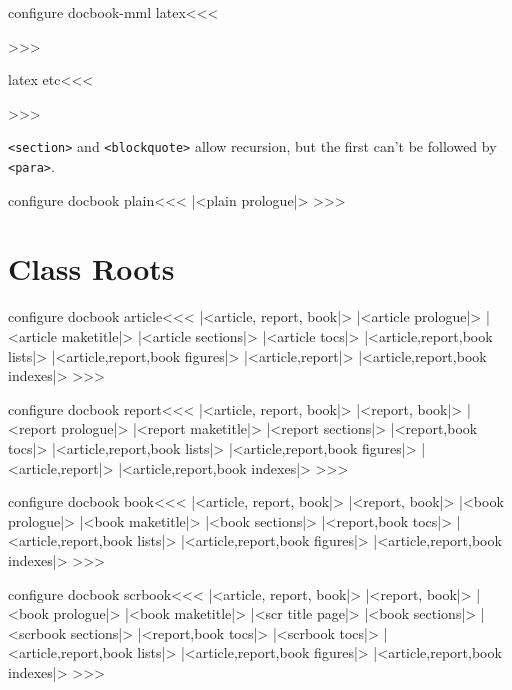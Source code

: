 \<configure docbook-mml latex\><<<
   {\IgnorePar\EndP{}}
   {}
   {\IgnorePar{}\ShowPar\par}
>>>







\<latex etc\><<<
   {\IgnorePar\EndP{}}
   {\ShowPar\par}
   {\IgnorePar\EndP{}\ShowPar\par}
>>>

\verb+<section>+ and \verb+<blockquote>+ allow recursion,
but the first can't be followed by \verb+<para>+.


\<configure docbook plain\><<< 
|<plain prologue|>
>>>

\section{Class Roots}

\<configure docbook article\><<< 
|<article, report, book|>
|<article prologue|>
|<article maketitle|>
|<article sections|>
|<article tocs|>
|<article,report,book lists|>
|<article,report,book figures|>
|<article,report|>
|<article,report,book indexes|>
>>>



\<configure docbook report\><<< 
|<article, report, book|>
|<report, book|>
|<report prologue|>
|<report maketitle|>
|<report sections|>
|<report,book tocs|>
|<article,report,book lists|>
|<article,report,book figures|>
|<article,report|>
|<article,report,book indexes|>
>>>



\<configure docbook book\><<< 
|<article, report, book|>
|<report, book|>
|<book prologue|>
|<book maketitle|>
|<book sections|>
|<report,book tocs|>
|<article,report,book lists|>
|<article,report,book figures|>
|<article,report,book indexes|>
>>>




\<configure docbook scrbook\><<< 
|<article, report, book|>
|<report, book|>
|<book prologue|>
|<book maketitle|>
|<scr title page|>
|<book sections|>
|<scrbook sections|>
|<report,book tocs|>
|<scrbook tocs|>
|<article,report,book lists|>
|<article,report,book figures|>
|<article,report,book indexes|>
>>>


